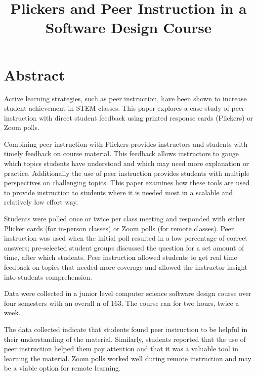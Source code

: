 \documentclass[12pt]{article}
\title{\large \textbf{Plickers and Peer Instruction in a Software Design Course}} %
\author{\normalsize}
\date{} %
\newcommand\sampleSize{163}
\begin{document}
\maketitle
\thispagestyle{empty}
\pagestyle{empty}

\section*{Abstract}
Active learning strategies, such as peer instruction, have been shown to increase student achievement in STEM classes.  This  paper explores a case study of peer instruction with direct student feedback using printed response cards (Plickers) or Zoom polls.

Combining peer instruction with Plickers provides instructors and students with timely feedback on course material.  This feedback allows instructors to gauge which topics students have understood and which may need more explanation or practice.  Additionally the use of peer instruction provides students with multiple perspectives on challenging topics.  This paper examines how these tools are used to provide instruction to students where it is needed most in a scalable and relatively low effort way.  

Students were polled once or twice per class meeting and responded with either Plicker cards (for in-person classes) or Zoom polls (for remote classes). Peer instruction was used  when the initial poll resulted in a low percentage of correct answers; pre-selected student groups  discussed the question for a set amount of time, after which students.  Peer instruction allowed students to get real time feedback on topics that needed more coverage and allowed the instructor insight into students comprehension.

Data were collected in a junior level computer science software design course over four semesters with an overall n of \sampleSize. The course ran for two hours, twice a week. 

The data collected indicate that students found peer instruction to be helpful in their understanding of the material.  Similarly, students reported that the use of peer instruction helped them pay attention and that it was a valuable tool in learning the material.  Zoom polls worked well during remote instruction and may be a viable option for remote learning.  
\end{document}

